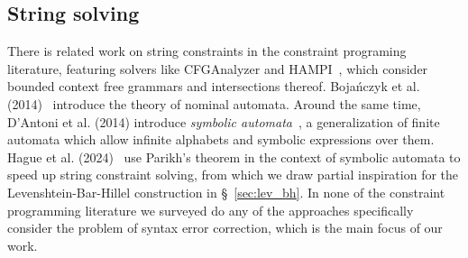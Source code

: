 \documentclass[sigplan,acmsmall,nonacm,screen]{acmart}\settopmatter{printfolios=false,printccs=false,printacmref=false}
\begin{document}

%

  \subsection{String solving}

  There is related work on string constraints in the constraint programing literature, featuring solvers like CFGAnalyzer and HAMPI~\cite{kiezun2009hampi}, which consider bounded context free grammars and intersections thereof. Boja{\'n}czyk et al. (2014)~\cite{bojanczyk2014automata} introduce the theory of nominal automata. Around the same time, D'Antoni et al. (2014) introduce \textit{symbolic automata}~\cite{dantoni2014minimization}, a generalization of finite automata which allow infinite alphabets and symbolic expressions over them. Hague et al. (2024)~\cite{hague2024parikh} use Parikh's theorem in the context of symbolic automata to speed up string constraint solving, from which we draw partial inspiration for the Levenshtein-Bar-Hillel construction in \S~\ref{sec:lev_bh}. In none of the constraint programming literature we surveyed do any of the approaches specifically consider the problem of syntax error correction, which is the main focus of our work.
\end{document}
